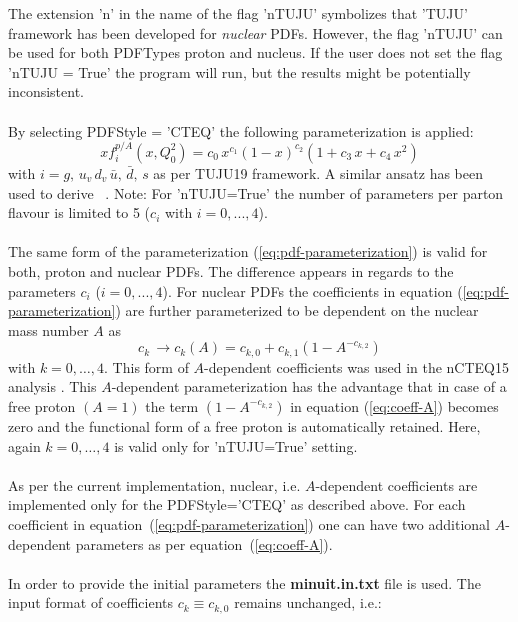 \documentclass{article}
\begin{document}
\noindent The extension 'n' in the name of the flag 'nTUJU' symbolizes that 'TUJU' framework has been developed for \textit{nuclear} PDFs. However, the flag 'nTUJU' can be used for both PDFTypes proton and nucleus. If the user does not set the flag 'nTUJU = True' the program will run, but the results might be potentially inconsistent. \\
\\
By selecting PDFStyle = 'CTEQ' the following parameterization is applied:
\begin{equation}
xf^{p/A}_i\left(x,Q_0^2 \right) = c_0\,x^{c_1} (1-x)^{c_2} \left(1+c_3\,x + c_4\,x^2 \right)
\label{eq:pdf-parameterization}
\end{equation}
with $i=g,\,u_v\,d_v\,\bar{u},\,\bar{d},\,s$ as per TUJU19 framework. A similar ansatz has been used to derive ~\cite{Abramowicz:2015mha}. Note: For 'nTUJU=True' the number of parameters per parton flavour is limited to 5 ($c_i$ with $i=0,...,4$).\\
\\
The same form of the parameterization (\ref{eq:pdf-parameterization}) is valid for both, proton and nuclear PDFs. The difference appears in regards to the parameters $c_i$ ($i=0,...,4$). For nuclear PDFs the coefficients in equation (\ref{eq:pdf-parameterization}) are further parameterized to be dependent on the nuclear mass number $A$ as
\begin{equation}
c_k\,\rightarrow c_k(A) = c_{k,0}+c_{k,1}\left( 1 - A^{-c_{k,2}} \right)
\label{eq:coeff-A}
\end{equation}
with $k={0,\dots,4}$. This form of $A$-dependent coefficients was used in the nCTEQ15 analysis \cite{Kovarik:2015cma}. This $A$-dependent parameterization has the advantage that in case of a free proton $(A=1)$ the term $\left( 1 - A^{-c_{k,2}} \right)$ in equation (\ref{eq:coeff-A}) becomes zero and the functional form of a free proton is automatically retained. Here, again $k={0,\dots,4}$ is valid only for 'nTUJU=True' setting.\\
\\
As per the current implementation, nuclear, i.e. $A$-dependent coefficients are implemented only for the PDFStyle='CTEQ' as described above. For each coefficient in equation~(\ref{eq:pdf-parameterization}) one can have two additional $A$-dependent parameters as per equation~(\ref{eq:coeff-A}).\\
\\
In order to provide the initial parameters the \textbf{minuit.in.txt} file is used. The input format of coefficients $c_k \equiv c_{k,0}$ remains unchanged, i.e.:\\ 
\end{document}
